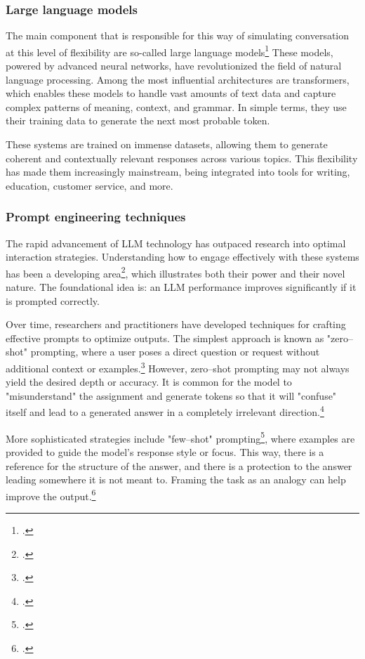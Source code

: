 \documentclass[12pt]{report}
\begin{document}
{\subsubsection{Large language models}

The main component that is responsible for
this way of simulating conversation at this level of flexibility
are so-called large language models\footcite{naveed2023comprehensive}
These models, powered by advanced neural networks,
have revolutionized the field of natural language processing.
Among the most influential architectures are transformers,
which enables these models to handle
vast amounts of text data and capture complex patterns of meaning, context, and grammar.
In simple terms, they use their training data to generate the next most probable token.

These systems are trained on immense datasets,
allowing them to generate coherent and contextually relevant responses across various topics.
This flexibility has made them increasingly mainstream,
being integrated into tools for writing, education, customer service, and more.

\subsubsection{Prompt engineering techniques}

The rapid advancement of LLM technology
has outpaced research into optimal interaction strategies.
Understanding how to engage effectively
with these systems has been a developing area\footcite{sahoo2024systematic},
which illustrates both their power and their novel nature.
The foundational idea is:
an LLM performance improves significantly if it is prompted correctly.

Over time, researchers and practitioners have developed techniques for
crafting effective prompts to optimize outputs.
The simplest approach is known as "zero–shot" prompting,
where a user poses a direct question or request without additional context or examples.\footcite{kong2023better,li2023practical}
However, zero–shot prompting may not always yield the desired depth or accuracy.
It is common for the model to "misunderstand" the assignment
and generate tokens so that it will "confuse" itself
and lead to a generated answer in a completely irrelevant direction.\footcite{hwang2025llms}

More sophisticated strategies include "few–shot" prompting\footcite{yao2023more},
where examples are provided to guide the model's response style or focus.
This way, there is a reference for the structure of the answer, and there is a protection to the answer leading somewhere it is not meant to.
Framing the task as an analogy can help improve the output.\footcite{stevenson2024can, qin2024relevant}

}
\end{document}
